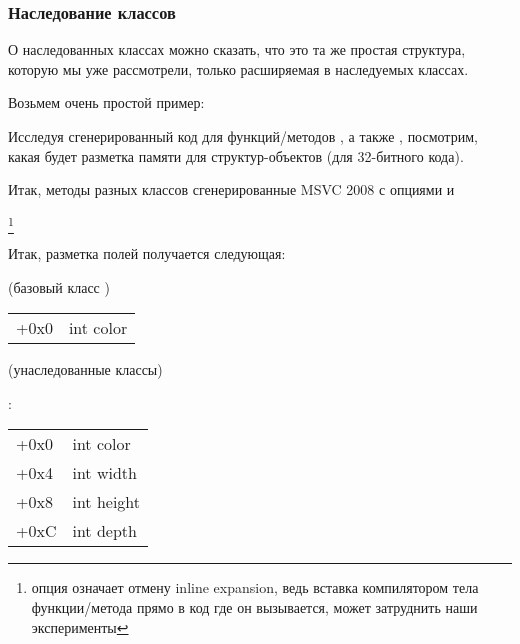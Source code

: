 \subsubsection{Наследование классов}
\label{cpp_inheritance}

О наследованных классах можно сказать, что это та же простая структура, которую мы уже рассмотрели, 
только расширяемая в наследуемых классах.


Возьмем очень простой пример:



Исследуя сгенерированный код для функций/методов , а также ,
посмотрим, какая будет разметка памяти для структур-объектов (для 32-битного кода).


Итак, методы  разных классов сгенерированные MSVC 2008 с опциями \Ox и \Obzero

\footnote{опция \Obzero означает отмену inline expansion, 
ведь вставка компилятором тела функции/метода прямо в код где он вызывается, 
может затруднить наши эксперименты
}







Итак, разметка полей получается следующая:

(базовый класс )

\begin{center}
\begin{tabular}{ | l | l | }
\hline
  \tableheader{} \\
\hline
  +0x0 & int color \\
\hline
\end{tabular}
\end{center}

(унаследованные классы)

:

\begin{center}
\begin{tabular}{ | l | l | }
\hline
  \tableheader{} \\
\hline
  +0x0 & int color \\
\hline
  +0x4 & int width \\
\hline
  +0x8 & int height \\
\hline
  +0xC & int depth \\
\hline
\end{tabular}
\end{center}

